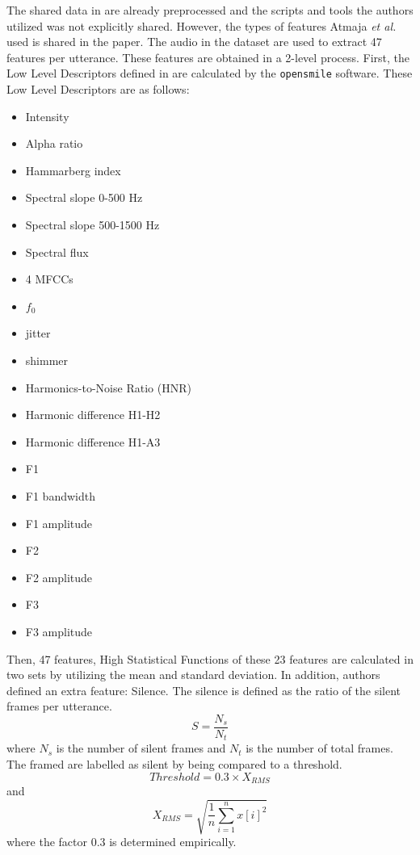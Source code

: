 \documentclass[a4paper,11pt]{article}
\begin{document}
The shared data in \cite{atmaja2020deep} are already preprocessed and the scripts and tools the authors utilized was not explicitly shared. However, the types of features Atmaja \textit{et al.} used is shared in the paper.  
The audio in the dataset are used to extract 47 features per utterance.
These features are obtained in a 2-level process. First, the Low Level Descriptors defined in \cite{eyben2010opensmile} are calculated by the \texttt{opensmile} software. These Low Level Descriptors are as follows: 
\begin{multicols}{3}
\begin{itemize}
    \item Intensity
    \item Alpha ratio
    \item Hammarberg index
    \item Spectral slope 0-500 Hz
    \item Spectral slope 500-1500 Hz
    \item Spectral flux
    \item 4 MFCCs
    \item $f_0$
    \item jitter
    \item shimmer
    \item Harmonics-to-Noise Ratio (HNR)
    \item Harmonic difference H1-H2
    \item Harmonic difference H1-A3
    \item F1
    \item F1 bandwidth
    \item F1 amplitude
    \item F2
    \item F2 amplitude
    \item F3 
    \item F3 amplitude
\end{itemize}
\end{multicols}

Then, 47 features, High Statistical Functions of these 23 features are calculated in two sets by utilizing the mean and standard deviation. In addition, authors defined an extra feature: Silence. The silence is defined as the ratio of the silent frames per utterance. 
\begin{equation}
    S = \frac{N_s}{N_t}
\end{equation}
where $N_s$ is the number of silent frames and $N_t$ is the number of total frames.
The framed are labelled as silent by being compared to a threshold. 
\begin{equation}
    Threshold = 0.3 \times X_{RMS}
\end{equation} 
and 
\begin{equation}
    X_{RMS} = \sqrt{\frac{1}{n}\sum_{i=1}^n{x[i]}^2}
\end{equation} 
where the factor 0.3 is determined empirically.
\end{document}
